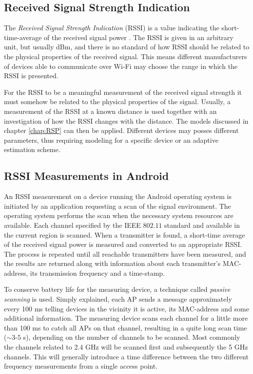 \documentclass{LTHthesis}
\begin{document}
\subsection{Received Signal Strength Indication}
%
The \emph{Received Signal Strength Indication} (RSSI) is a value indicating the short-time-average of the received signal power \cite{fig_fra10}. The RSSI is given in an arbitrary unit, but usually dBm, and there is no standard of how RSSI should be related to the physical properties of the received signal. This means different manufacturers of devices able to communicate over Wi-Fi may choose the range in which the RSSI is presented. 

For the RSSI to be a meaningful measurement of the received signal strength it must somehow be related to the physical properties of the signal. Usually, a measurement of the RSSI at a known distance is used together with an investigation of how the RSSI changes with the distance. The models discussed in chapter \ref{chap:RSP} can then be applied. Different devices may posses different parameters, thus requiring modeling for a specific device or an adaptive estimation scheme. 
%

\subsection{RSSI Measurements in Android}

An RSSI measurement on a device running the Android operating system is initiated by an application requesting a scan of the signal environment. The operating system performs the scan when the necessary system resources are available. Each channel specified by the IEEE $802.11$ standard and available in the current region is scanned. When a transmitter is found, a short-time average of the received signal power is measured and converted to an appropriate RSSI. The process is repeated until all reachable transmitters have been measured, and the results are returned along with information about each transmitter's MAC-address, its transmission frequency and a time-stamp. 

To conserve battery life for the measuring device, a technique called \emph{passive scanning} is used. Simply explained, each AP sends a message approximately every 100 ms telling devices in the vicinity it is active, its MAC-address and some additional information. The measuring device scans each channel for a little more than 100 ms to catch all APs on that channel, resulting in a quite long scan time ($\sim 3$-$5$ s), depending on the number of channels to be scanned. Most commonly the channels related to 2.4 GHz will be scanned first and subsequently the 5 GHz channels. This will generally introduce a time difference between the two different frequency measurements from a single access point.
\end{document}
